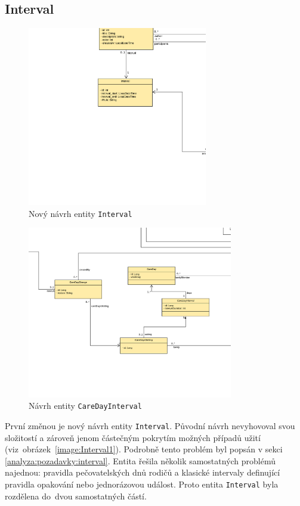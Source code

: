     \subsection{Interval}\label{navrh:upravy:interval}
        \begin{figure}\centering
	        \includegraphics[width=0.7\textwidth]{pdfs/Interval2}
	        \caption[Nový návrh entity \texttt{Interval}]{Nový návrh entity \texttt{Interval}}\label{image:Interval2}
        \end{figure}
        \begin{figure}\centering
	        \includegraphics[width=0.8\textwidth]{pdfs/CareDayInterval}
	        \caption[Návrh entity \texttt{CareDayInterval}]{Návrh entity \texttt{CareDayInterval}}\label{image:careDayInterval}
        \end{figure}
        První změnou je nový návrh entity \verb|Interval|. Původní návrh nevyhovoval svou složitostí a zároveň jenom částečným pokrytím možných případů užití (viz~obrázek~\ref{image:Interval1}). Podrobně tento problém byl popsán v sekci \ref{analyza:pozadavky:interval}. Entita řešila několik samostatných problémů najednou: pravidla pečovatelských dnů rodičů a klasické intervaly definující pravidla opakování nebo jednorázovou událost. Proto entita \verb|Interval| byla rozdělena do~dvou samostatných částí.
